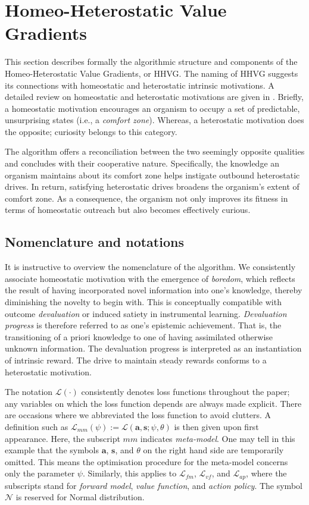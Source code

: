 \documentclass[utf8]{frontiersSCNS}
\newcommand{\bs}{\boldsymbol}
\begin{document}
\section{Homeo-Heterostatic Value Gradients} \label{sec:algorithm}

This section describes formally the algorithmic structure and components of the Homeo-Heterostatic Value Gradients, or HHVG. The naming of HHVG suggests its connections with homeostatic and heterostatic intrinsic motivations. A detailed review on homeostatic and heterostatic motivations are given in \cite{intrinsicmotiv}. Briefly, a homeostatic motivation encourages an organism to occupy a set of predictable, unsurprising states (i.e., a {\it comfort zone}). Whereas, a heterostatic motivation does the opposite; curiosity belongs to this category.

The algorithm offers a reconciliation between the two seemingly opposite qualities and concludes with their cooperative nature. Specifically, the knowledge an organism maintains about its comfort zone helps instigate outbound heterostatic drives. In return, satisfying heterostatic drives broadens the organism's extent of comfort zone. As a consequence, the organism not only improves its fitness in terms of homeostatic outreach but also becomes effectively curious.

\subsection{Nomenclature and notations} \label{subsec:notation}

It is instructive to overview the nomenclature of the algorithm. We consistently associate homeostatic motivation with the emergence of {\it boredom}, which reflects the result of having incorporated novel information into one's knowledge, thereby diminishing the novelty to begin with. This is conceptually compatible with outcome {\it devaluation} or induced satiety in instrumental learning. {\it Devaluation progress} is therefore referred to as one's epistemic achievement. That is, the transitioning of a priori knowledge to one of having assimilated otherwise unknown information. The devaluation progress is interpreted as an instantiation of intrinsic reward. The drive to maintain steady rewards conforms to a heterostatic motivation.

The notation $\mathcal L(\cdot)$ consistently denotes loss functions throughout the paper; any variables on which the loss function depends are always made explicit. There are occasions where we abbreviated the loss function to avoid clutters. A definition such as $\mathcal L_{mm}(\psi) := \mathcal L(\bs a, \bs s; \psi, \theta)$ is then given upon first appearance. Here, the subscript $mm$ indicates {\it meta-model}. One may tell in this example that the symbols $\bs a$, $\bs s$, and $\theta$ on the right hand side are temporarily omitted. This means the optimisation procedure for the meta-model concerns only the parameter $\psi$. Similarly, this applies to $\mathcal L_{fm}$, $\mathcal L_{vf}$, and $\mathcal L_{ap}$, where the subscripts stand for {\it forward model}, {\it value function}, and {\it action policy}. The symbol $\mathcal N$ is reserved for Normal distribution. 
\end{document}
